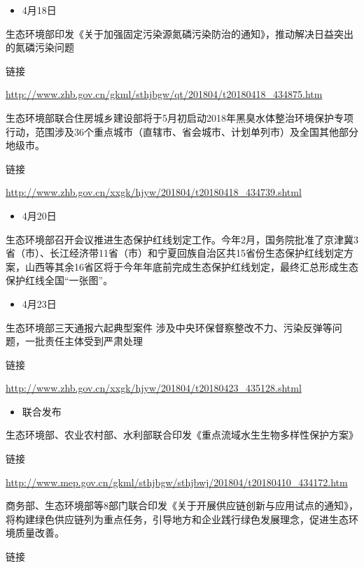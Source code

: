 \documentclass[]{book}
\providecommand{\tightlist}{%
  \setlength{\itemsep}{0pt}\setlength{\parskip}{0pt}}
\begin{document}
\begin{itemize}
\tightlist
\item
  4月18日
\end{itemize}

生态环境部印发《关于加强固定污染源氮磷污染防治的通知》，推动解决日益突出的氮磷污染问题

链接

\url{http://www.zhb.gov.cn/gkml/sthjbgw/qt/201804/t20180418_434875.htm}

生态环境部联合住房城乡建设部将于5月初启动2018年黑臭水体整治环境保护专项行动，范围涉及36个重点城市（直辖市、省会城市、计划单列市）及全国其他部分地级市。

链接

\url{http://www.zhb.gov.cn/xxgk/hjyw/201804/t20180418_434739.shtml}

\begin{itemize}
\tightlist
\item
  4月20日
\end{itemize}

生态环境部召开会议推进生态保护红线划定工作。今年2月，国务院批准了京津冀3省（市）、长江经济带11省（市）和宁夏回族自治区共15省份生态保护红线划定方案，山西等其余16省区将于今年年底前完成生态保护红线划定，最终汇总形成生态保护红线全国``一张图''。

\begin{itemize}
\tightlist
\item
  4月23日
\end{itemize}

生态环境部三天通报六起典型案件
涉及中央环保督察整改不力、污染反弹等问题，一批责任主体受到严肃处理

链接

\url{http://www.zhb.gov.cn/xxgk/hjyw/201804/t20180423_435128.shtml}

\begin{itemize}
\tightlist
\item
  联合发布
\end{itemize}

生态环境部、农业农村部、水利部联合印发《重点流域水生生物多样性保护方案》

链接

\url{http://www.mep.gov.cn/gkml/sthjbgw/sthjbwj/201804/t20180410_434172.htm}

商务部、生态环境部等8部门联合印发《关于开展供应链创新与应用试点的通知》，将构建绿色供应链列为重点任务，引导地方和企业践行绿色发展理念，促进生态环境质量改善。

链接
\end{document}
